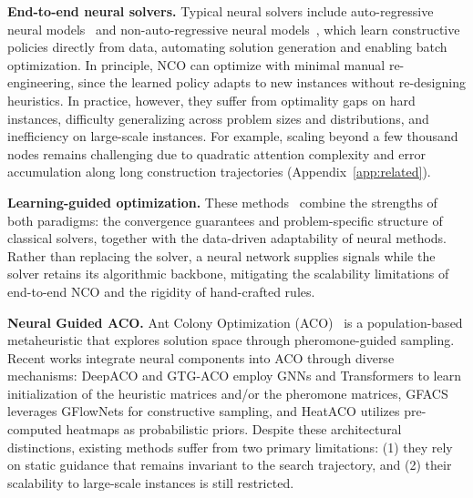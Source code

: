 \documentclass[sigconf]{acmart}
\newcommand{\DyNACO}{\textsc{DyNACO}}
\begin{document}
\smallskip\noindent\textbf{End-to-end neural solvers.} Typical neural solvers include auto-regressive neural models~\cite{attentionmodel,pomo} and non-auto-regressive neural models~\cite{bq,lehd,invit,sigd,l2c}, which learn constructive policies directly from data, automating solution generation and enabling batch optimization. In principle, NCO can optimize with minimal manual re-engineering, since the learned policy adapts to new instances without re-designing heuristics. In practice, however, they suffer from optimality gaps on hard instances, difficulty generalizing across problem sizes and distributions, and inefficiency on large-scale instances. For example, scaling beyond a few thousand nodes remains challenging due to quadratic attention complexity and error accumulation along long construction trajectories (Appendix~\ref{app:related}).

\smallskip\noindent\textbf{Learning-guided optimization.}
These methods~\cite{learn2branch, learn2delegate, neurolkh} combine the strengths of both paradigms: the convergence guarantees and problem-specific structure of classical solvers, together with the data-driven adaptability of neural methods.
Rather than replacing the solver, a neural network supplies signals while the solver retains its algorithmic backbone, mitigating the scalability limitations of end-to-end NCO and the rigidity of hand-crafted rules. 

\smallskip\noindent\textbf{Neural Guided ACO.}  Ant Colony Optimization (ACO)~\cite{ACO, maxmin} is a population-based metaheuristic that explores solution space through pheromone-guided sampling. Recent works integrate neural components into ACO through diverse mechanisms: DeepACO \cite{deepaco} and GTG-ACO \cite{gtgaco} employ GNNs and Transformers to learn initialization of the heuristic matrices and/or the pheromone matrices, GFACS \cite{gfacs} leverages GFlowNets for constructive sampling, and HeatACO \cite{heataco} utilizes pre-computed heatmaps as probabilistic priors. Despite these architectural distinctions, existing methods suffer from two primary limitations: (1) they rely on static guidance that remains invariant to the search trajectory, and (2) their scalability to large-scale instances is still restricted.
\end{document}
